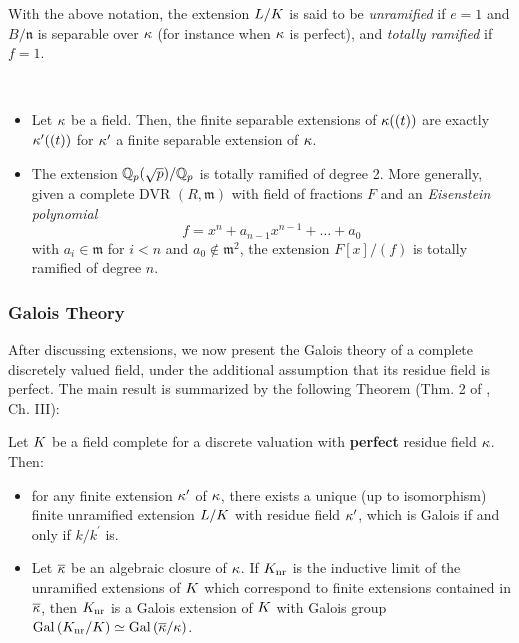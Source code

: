 \documentclass[a4paper, oneside]{memoir}
\begin{document}
\begin{definition}
    With the above notation, the extension $L/K$ is said to be \textit{unramified} if $e=1$ and $B /\mathfrak{n}$ is separable over $\kappa$ (for instance when $\kappa$ is perfect), and \textit{totally ramified} if $f=1$.
\end{definition}

\begin{example}\
    \begin{itemize}
        \item Let $\kappa$ be a field. Then, the finite separable extensions of $\kappa((t))$ are exactly $\kappa^{\prime}((t))$ for $\kappa^{\prime} $ a finite separable extension of $\kappa$.
        \item The extension $\mathbb{Q}_p(\sqrt{p})/\mathbb{Q}_p$ is totally ramified of degree 2. More generally, given a complete DVR $(R,\mathfrak{m})$ with field of fractions $F$ and an \textit{Eisenstein polynomial}
              \[
                  f=x^n+a_{n-1}x^{n-1}+\ldots+a_0
              \]
              with $a_i\in\mathfrak{m}$ for $i<n$ and $a_0\not\in\mathfrak{m}^2$, the extension $F[x]/(f)$ is totally ramified of degree $n$.
    \end{itemize}
\end{example}
\subsubsection{Galois Theory}
After discussing extensions, we now present the Galois theory of a complete discretely valued field, under the additional assumption that its residue field is perfect. The main result is summarized by the following Theorem (Thm. 2 of \cite{SerreCL}, Ch. III):

\begin{theorem}Let $K$ be a field complete for a discrete valuation with \textbf{perfect} residue field $\kappa$. Then:
    \begin{itemize}
        \item for any finite extension $\kappa^{\prime} $ of \(\kappa\), there exists a unique (up to isomorphism) finite unramified extension $L / K$ with residue field $\kappa^{\prime} $, which is Galois if and only if $k/k^{\prime}$ is.
        \item Let \(\overline{\kappa}\) be an algebraic closure of \(\kappa\). If $K_{\text{nr}}$ is the inductive limit of the unramified extensions of $K$ which correspond to finite extensions
              contained in $\overline{\kappa}$, then $K_{\text{nr}}$ is a Galois extension of $K$ with Galois group $\operatorname{Gal}{(K_{\text{nr}}/K)}\simeq \operatorname{Gal}{(\overline{\kappa}/\kappa)}$.
    \end{itemize}
\end{theorem}
\end{document}
